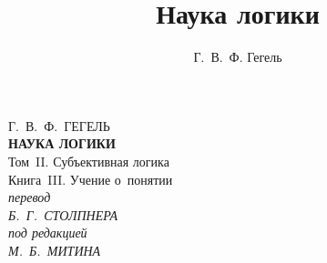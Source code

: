 \documentclass[a5paper, 11pt, twoside, onecolumn, openany]{memoir}
\author{Г.~В.~Ф. Гегель}
\title{Наука логики}
\date{}
\begin{document}
\frontmatter
\pagestyle{empty}

{\centering
  {\Large Г.~В.~Ф.~ГЕГЕЛЬ} \\
  \vspace{130pt}
  \textbf{\Huge НАУКА ЛОГИКИ} \\
  \vspace{60pt}
  {\Large Том~II. Субъективная логика} \\
  \vspace{8pt}
  {\large Книга~III. Учение о~понятии} \\
  \vspace{70pt}
  \textit{перевод} \\
  \textit{Б.~Г.~СТОЛПНЕРА} \\
  \vspace{10pt}
  \textit{под редакцией} \\
  \textit{М.~Б.~МИТИНА}
\par}

\clearpage

\mainmatter
\pagestyle{plain}



\backmatter

\clearpage
\tableofcontents*
\clearpage
\end{document}
